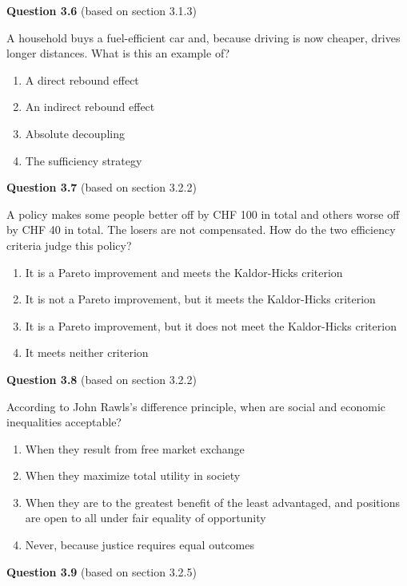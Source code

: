 \documentclass[
  british,
  a4paper,
  DIV=11,
  numbers=noendperiod,
  oneside,
  openany]{scrreprt}
\providecommand{\tightlist}{%
  \setlength{\itemsep}{0pt}\setlength{\parskip}{0pt}}
\begin{document}
\textbf{Question 3.6} (based on section 3.1.3)

A household buys a fuel-efficient car and, because driving is now
cheaper, drives longer distances. What is this an example of?

\begin{enumerate}
\def\labelenumi{\alph{enumi})}
\tightlist
\item
  A direct rebound effect
\item
  An indirect rebound effect
\item
  Absolute decoupling
\item
  The sufficiency strategy
\end{enumerate}

\textbf{Question 3.7} (based on section 3.2.2)

A policy makes some people better off by CHF 100 in total and others
worse off by CHF 40 in total. The losers are not compensated. How do the
two efficiency criteria judge this policy?

\begin{enumerate}
\def\labelenumi{\alph{enumi})}
\tightlist
\item
  It is a Pareto improvement and meets the Kaldor-Hicks criterion
\item
  It is not a Pareto improvement, but it meets the Kaldor-Hicks
  criterion
\item
  It is a Pareto improvement, but it does not meet the Kaldor-Hicks
  criterion
\item
  It meets neither criterion
\end{enumerate}

\textbf{Question 3.8} (based on section 3.2.2)

According to John Rawls's difference principle, when are social and
economic inequalities acceptable?

\begin{enumerate}
\def\labelenumi{\alph{enumi})}
\tightlist
\item
  When they result from free market exchange
\item
  When they maximize total utility in society
\item
  When they are to the greatest benefit of the least advantaged, and
  positions are open to all under fair equality of opportunity
\item
  Never, because justice requires equal outcomes
\end{enumerate}

\textbf{Question 3.9} (based on section 3.2.5)
\end{document}
